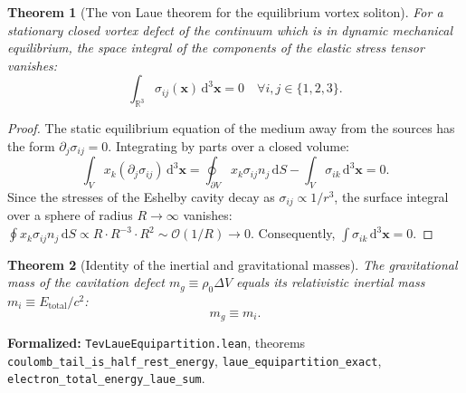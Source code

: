 \documentclass[11pt,a4paper]{article}
\newtheorem{theorem}{Theorem}
\theoremstyle{definition}
\theoremstyle{remark}
\begin{document}
\begin{theorem}[The von Laue theorem for the equilibrium vortex soliton]
\label{thm:laue_equilibrium}
For a stationary closed vortex defect of the continuum which is in dynamic mechanical equilibrium, the space integral of the components of the elastic stress tensor vanishes:
\begin{equation}
	\int_{\mathbb{R}^3} \sigma_{ij}(\mathbf{x}) \, \mathrm{d}^3\mathbf{x} = 0 \quad \forall i, j \in \{1, 2, 3\}.
	\label{eq:laue_equilibrium_zero}
\end{equation}
\end{theorem}

\begin{proof}
The static equilibrium equation of the medium away from the sources has the form $\partial_j \sigma_{ij} = 0$. Integrating by parts over a closed volume:
\begin{equation}
	\int_V x_k (\partial_j \sigma_{ij}) \, \mathrm{d}^3\mathbf{x} = \oint_{\partial V} x_k \sigma_{ij} n_j \, \mathrm{d}S - \int_V \sigma_{ik} \, \mathrm{d}^3\mathbf{x} = 0.
\end{equation}
Since the stresses of the Eshelby cavity decay as $\sigma_{ij} \propto 1/r^3$, the surface integral over a sphere of radius $R \to \infty$ vanishes: $\oint x_k \sigma_{ij} n_j \, \mathrm{d}S \propto R \cdot R^{-3} \cdot R^2 \sim \mathcal{O}(1/R) \to 0$. Consequently, $\int \sigma_{ik} \, \mathrm{d}^3\mathbf{x} = 0$.
\end{proof}

\begin{theorem}[Identity of the inertial and gravitational masses]
\label{thm:equivalence_principle_exact}
The gravitational mass of the cavitation defect $m_g \equiv \rho_0 \Delta V$ equals its relativistic inertial mass $m_i \equiv E_{\mathrm{total}} / c^2$:
\begin{equation}
	m_g \equiv m_i.
	\label{eq:equivalence_principle_identity}
\end{equation}
\end{theorem}

\noindent\small\textbf{Formalized:} \texttt{TevLaueEquipartition.lean}, theorems \texttt{coulomb\_tail\_is\_half\_rest\_energy}, \texttt{laue\_equipartition\_exact}, \texttt{electron\_total\_energy\_laue\_sum}.
\end{document}
